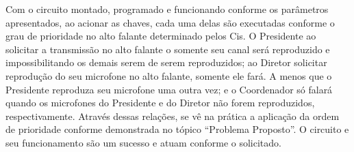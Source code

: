\documentclass{article}
\begin{document}
Com o circuito montado, programado e funcionando conforme os parâmetros apresentados, ao acionar as chaves, cada uma delas são executadas conforme o grau de prioridade no alto falante determinado pelos Cis. O Presidente ao solicitar a transmissão no alto falante o somente seu canal será reproduzido e impossibilitando os demais serem de serem reproduzidos; ao Diretor solicitar reprodução do seu microfone no alto falante, somente ele fará. A menos que o Presidente reproduza seu microfone uma outra vez; e o Coordenador só falará quando os microfones do Presidente e do Diretor não forem reproduzidos, respectivamente. Através dessas relações, se vê na prática a aplicação da ordem de prioridade conforme demonstrada no tópico ``Problema Proposto''. O circuito e seu funcionamento são um sucesso e atuam conforme o solicitado.

\medskip
\end{document}
